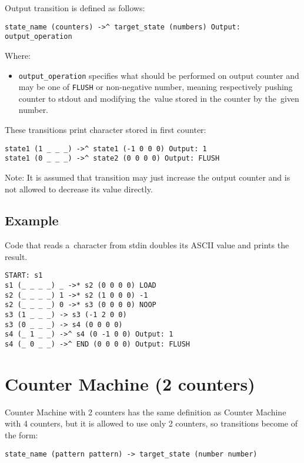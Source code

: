 \documentclass[english,shortabstract,mgr]{iithesis}
\begin{document}
Output transition is defined as follows:
\begin{verbatim}
state_name (counters) ->^ target_state (numbers) Output: output_operation
\end{verbatim}

Where:
\begin{itemize}
  \item \texttt{output\_operation} specifies what should be performed
      on output counter and may be one of \texttt{FLUSH} or non-negative number,
      meaning respectively pushing counter to stdout and modifying
      the~value stored in the counter by the~given number.
\end{itemize}

These transitions print character stored in first counter:
\begin{verbatim}
state1 (1 _ _ _) ->^ state1 (-1 0 0 0) Output: 1
state1 (0 _ _ _) ->^ state2 (0 0 0 0) Output: FLUSH
\end{verbatim}

Note: It is assumed that transition may just increase the output counter
and is not allowed to decrease its value directly.


\subsection{Example}

Code that reads a~character from stdin doubles its ASCII value and prints the result.
\begin{verbatim}
START: s1
s1 (_ _ _ _) _ ->* s2 (0 0 0 0) LOAD
s2 (_ _ _ _) 1 ->* s2 (1 0 0 0) -1
s2 (_ _ _ _) 0 ->* s3 (0 0 0 0) NOOP
s3 (1 _ _ _) -> s3 (-1 2 0 0)
s3 (0 _ _ _) -> s4 (0 0 0 0)
s4 (_ 1 _ _) ->^ s4 (0 -1 0 0) Output: 1
s4 (_ 0 _ _) ->^ END (0 0 0 0) Output: FLUSH
\end{verbatim}

\section {Counter Machine (2 counters)}

Counter Machine with 2 counters has the same definition as
Counter Machine with 4 counters, but it is allowed to use only
2 counters, so transitions become of the form:

\begin{verbatim}
state_name (pattern pattern) -> target_state (number number)
\end{verbatim}
\end{document}
